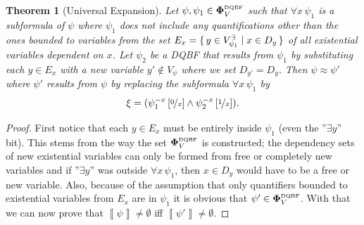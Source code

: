 \documentclass[
  digital, %
  twoside, %
  table,   %
  nolof,     %
  nolot,     %
]{fithesis3}
\let\setbuilder\set
\newcommand{\simpleset}[1]{\{{#1}\}}
\renewcommand{\set}[1]{\normalexpandarg\IfSubStr{#1}{|}{\setbuilder{#1}}{\simpleset{#1}}}
\newtheorem{theorem}{Theorem}[chapter] %
\theoremstyle{definition}
\theoremstyle{remark}
\newcommand{\seman}[1]{\left\llbracket {#1} \right\rrbracket}
\newcommand{\substitute}[2]{\left[ \nicefrac{#2}{#1} \right]}
\newcommand{\DQBF}[1]{\mathbf{\Phi}_{#1}^{\normalfont{\text{\tiny DQBF}}}}
\newcommand{\evars}[1]{V_{#1}^{\exists}}
\newcommand{\itholds}{\,}
\begin{document}
\begin{theorem}[Universal Expansion]
\label{thrm:unExpan}
  Let $\psi, \psi_1 \in \DQBF{V}$ such that $\forall x \itholds \psi_1$ is a subformula of $\psi$ where $\psi_1$ does not include any quantifications other than the ones bounded to variables from the set $E_{x} = \set{y \in \evars{\psi_1} | x \in D_y}$ of all existential variables dependent on $x$. Let $\psi_2$ be a DQBF that results from $\psi_1$ by substituting each $y \in E_x$ with a new variable $y' \not\in V_{\psi}$ where we set $D_{y'} = D_y$. Then $\psi \approx \psi'$ where $\psi'$ results from $\psi$ by replacing the subformula $\forall x \itholds \psi_1$ by 
  \[\xi = (\psi_1^{-x}\substitute{x}{0} \land \psi_2^{-x}\substitute{x}{1}).\]
\end{theorem}
\begin{proof}
  First notice that each $y \in E_x$ must be entirely inside $\psi_1$ (even the ''$\exists y$'' bit). This stems from the way the set $\DQBF{V}$ is constructed; the dependency sets of new existential variables can only be formed from free or completely new variables and if ''$\exists y$'' was outside $\forall x \itholds \psi_1$, then $x \in D_y$ would have to be a free or new variable. Also, because of the assumption that only quantifiers bounded to existential variables from $E_x$
  are in $\psi_1$ it is obvious that $\psi' \in \DQBF{V}$. With that we can now prove that $\seman{\psi} \not= \emptyset$ iff $\seman{\psi'} \not= \emptyset$.
  

\end{proof}
\end{document}
